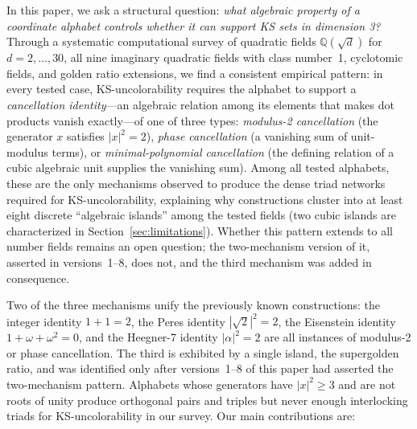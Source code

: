\documentclass[12pt,a4paper]{article}
\newcommand{\Q}{\mathbb{Q}}
\begin{document}
In this paper, we ask a structural question: \emph{what algebraic property of a coordinate alphabet controls whether it can support KS sets in dimension 3?} Through a systematic computational survey of quadratic fields $\Q(\sqrt{d})$ for $d = 2, \ldots, 30$, all nine imaginary quadratic fields with class number~1, cyclotomic fields, and golden ratio extensions, we find a consistent empirical pattern: in every tested case, KS-uncolorability requires the alphabet to support a \emph{cancellation identity}---an algebraic relation among its elements that makes dot products vanish exactly---of one of three types: \emph{modulus-2 cancellation} (the generator $x$ satisfies $|x|^2 = 2$), \emph{phase cancellation} (a vanishing sum of unit-modulus terms), or \emph{minimal-polynomial cancellation} (the defining relation of a cubic algebraic unit supplies the vanishing sum). Among all tested alphabets, these are the only mechanisms observed to produce the dense triad networks required for KS-uncolorability, explaining why constructions cluster into at least eight discrete ``algebraic islands'' among the tested fields (two cubic islands are characterized in Section~\ref{sec:limitations}). Whether this pattern extends to all number fields remains an open question; the two-mechanism version of it, asserted in versions~1--8, does not, and the third mechanism was added in consequence.

Two of the three mechanisms unify the previously known constructions: the integer identity $1 + 1 = 2$, the Peres identity $|\sqrt{2}|^2 = 2$, the Eisenstein identity $1 + \omega + \omega^2 = 0$, and the Heegner-7 identity $|\alpha|^2 = 2$ are all instances of modulus-2 or phase cancellation.  The third is exhibited by a single island, the supergolden ratio, and was identified only after versions~1--8 of this paper had asserted the two-mechanism pattern.  Alphabets whose generators have $|x|^2 \geq 3$ and are not roots of unity produce orthogonal pairs and triples but never enough interlocking triads for KS-uncolorability in our survey.  Our main contributions are:
\end{document}
